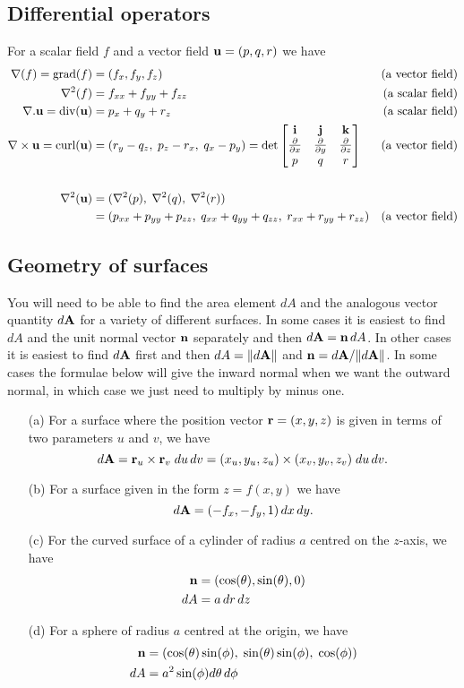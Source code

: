 \documentclass{amsart}
\begin{document}
\subsection*{Differential operators}

For a scalar field $f$ and a vector field $\mathbf{u}=(p,q,r)$ we have
\begin{align*}
 \nabla(f) = \operatorname{grad}(f) &= (f_x,f_y,f_z)  & \text{(a vector field)} \\
 \nabla^2(f) &= f_{xx}+f_{yy}+f_{zz} & \text{(a scalar field)} \\
 \nabla.\mathbf{u} = \operatorname{div}(\mathbf{u}) &= p_x+q_y+r_z  & \text{(a scalar field)} \\
 \nabla\times\mathbf{u} = \operatorname{curl}(\mathbf{u}) &=
  (r_y-q_z,\;p_z-r_x,\;q_x-p_y)
   = \det \left[\begin{matrix} \mathbf{i} & \mathbf{j} & \mathbf{k} \\ \frac{\partial}{\partial x} & \frac{\partial}{\partial y} & \frac{\partial}{\partial z} \\ p & q & r \end{matrix}\right]
    & \text{(a vector field)} \\
 \\
 \nabla^2(\mathbf{u}) &= (\nabla^2(p),\;\nabla^2(q),\;\nabla^2(r)) \\
  &= (p_{xx}+p_{yy}+p_{zz},\;q_{xx}+q_{yy}+q_{zz},\;r_{xx}+r_{yy}+r_{zz})
     & \text{(a vector field)} \\
\end{align*}

\subsection*{Geometry of surfaces}

You will need to be able to find the area element $dA$ and the
analogous vector quantity $d\mathbf{A}$ for a variety of different
surfaces.  In some cases it is easiest to find $dA$ and the unit
normal vector $\mathbf{n}$ separately and then $d\mathbf{A}=\mathbf{n}\,dA$.  In other
cases it is easiest to find $d\mathbf{A}$ first and then $dA=\|d\mathbf{A}\|$ and
$\mathbf{n}=d\mathbf{A}/\|d\mathbf{A}\|$.  In some cases the formulae below will give the
inward normal when we want the outward normal, in which case we just
need to multiply by minus one.

\begin{itemize}
 \item[(a)] For a surface where the position vector $\mathbf{r}=(x,y,z)$ is
  given in terms of two parameters $u$ and $v$, we have 
  \[ d\mathbf{A} = \mathbf{r}_u \times \mathbf{r}_v \;du\,dv =
      (x_u,y_u,z_u)\times(x_v,y_v,z_v)\;du\,dv.
  \]
 \item[(b)] For a surface given in the form $z=f(x,y)$ we have
  \[ d\mathbf{A} = (-f_x,-f_y,1) \,dx\,dy. \]
 \item[(c)] For the curved surface of a cylinder of radius $a$ centred
  on the $z$-axis, we have 
  \begin{align*}
   \mathbf{n} &= (\cos(\theta),\sin(\theta),0) \\
   dA &= a\,dr\,dz 
  \end{align*}
 \item[(d)] For a sphere of radius $a$ centred at the origin, we have 
  \begin{align*}
   \mathbf{n} &= (\cos(\theta)\sin(\phi),\;\sin(\theta)\sin(\phi),\;\cos(\phi))
   \\
   dA &= a^2\sin(\phi) d\theta\,d\phi 
  \end{align*}
\end{itemize}
\end{document}
